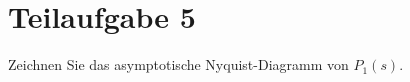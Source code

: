 \section{Teilaufgabe 5}
\begin{aufgabe}
    Zeichnen Sie das asymptotische Nyquist-Diagramm von $P_1(s)$.
\end{aufgabe}
